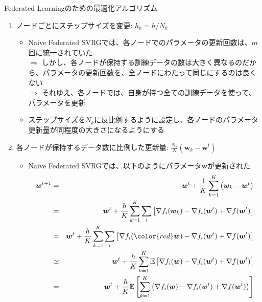 \documentclass[dvipdfmx,notheorems,t]{beamer}
\begin{document}
\begin{frame}{Federated Learningのための最適化アルゴリズム}

\begin{enumerate}
	\item ノードごとにステップサイズを変更: $h_k = h / N_k$
	\begin{itemize}
		\item Naive Federated SVRGでは、各ノードでのパラメータの更新回数は、$m$回に統一されていた \\
		$\Rightarrow$ しかし、各ノードが保持する訓練データの数は大きく異なるのだから、パラメータの更新回数を、全ノードにわたって同じにするのは良くない \\
		$\Rightarrow$ それゆえ、各ノードでは、自身が持つ全ての訓練データを使って、パラメータを更新
		\newline
		
		\item ステップサイズを$N_k$に反比例するように設定し、各ノードのパラメータ更新量が同程度の大きさになるようにする
	\end{itemize}
	
	\framebreak
	
	\item 各ノードが保持するデータ数に比例した更新量: $\frac{N_k}{N} \left( \bm{w}_k - \bm{w}^t \right)$
	\begin{itemize}
		\item Naive Federated SVRGでは、以下のようにパラメータ$\bm{w}$が更新された
		\begin{eqnarray}
			\bm{w}^{t + 1} &=& \bm{w}^t + \frac{1}{K} \sum_{k = 1}^K \left( \bm{w}_k - \bm{w}^t \right) \nonumber \\
			&=& \bm{w}^t + \frac{h}{K} \sum_{k = 1}^K \sum_i \left[ \nabla f_i(\bm{w}_k) - \nabla f_i(\bm{w}^t) + \nabla f(\bm{w}^t) \right] \nonumber \\
			&=& \bm{w}^t + \frac{h}{K} \sum_{k = 1}^K \sum_i \left[ \nabla f_i(\color{red}\bm{w}\normalcolor) - \nabla f_i(\bm{w}^t) + \nabla f(\bm{w}^t) \right] \nonumber \\
			&\simeq& \bm{w}^t + \frac{h}{K} \sum_{k = 1}^K \mathbb{E} \left[ \nabla f_i(\bm{w}) - \nabla f_i(\bm{w}^t) + \nabla f(\bm{w}^t) \right] \nonumber \\
			&=& \bm{w}^t + \frac{h}{K} \mathbb{E} \left[ \sum_{k = 1}^K \left( \nabla f_i(\bm{w}) - \nabla f_i(\bm{w}^t) + \nabla f(\bm{w}^t) \right) \right] \nonumber
		\end{eqnarray}
		
		\framebreak
		

\end{itemize}
\end{enumerate}
\end{frame}
\end{document}
